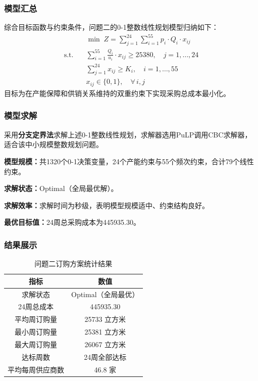 \documentclass[12pt,a4paper]{ctexart}
\theoremstyle{definition}
\theoremstyle{plain}
\theoremstyle{remark}
\begin{document}
\subsubsection{模型汇总}

综合目标函数与约束条件，问题二的0-1整数线性规划模型归纳如下：
\begin{align*}
&\min \; Z = \sum_{j=1}^{24} \sum_{i=1}^{55} p_i \cdot Q_i \cdot x_{ij} \\
\text{s.t.} \quad
&\sum_{i=1}^{55} \frac{Q_i}{u_i} \cdot x_{ij} \geq 25380, \quad j = 1, \dots, 24 \\
&\sum_{j=1}^{24} x_{ij} \geq K_i, \quad i = 1, \dots, 55 \\
&x_{ij} \in \{0, 1\}, \quad \forall\, i, j
\end{align*}
目标为在产能保障和供销关系维持的双重约束下实现采购总成本最小化。

\subsubsection{模型求解}

采用\textbf{分支定界法}求解上述0-1整数线性规划，求解器选用PuLP调用CBC求解器，适合该中小规模整数规划问题。

\textbf{模型规模：}共1320个0-1决策变量，24个产能约束与55个频次约束，合计79个线性约束。

\textbf{求解状态：}Optimal（全局最优解）。

\textbf{求解效率：}求解时间为秒级，表明模型规模适中、约束结构良好。

\textbf{最优目标值：}24周总采购成本为445935.30。

\subsubsection{结果展示}

\begin{table}[H]
\centering
\caption{问题二订购方案统计结果}
\label{tab:order}
\begin{tabular}{cc}
\toprule
指标 & 数值 \\
\midrule
求解状态 & Optimal（全局最优） \\
24周总成本 & 445935.30 \\
平均周订购量 & 25733 立方米 \\
最小周订购量 & 25381 立方米 \\
最大周订购量 & 26067 立方米 \\
达标周数 & 24周全部达标 \\
平均每周供应商数 & 46.8 家 \\
\bottomrule
\end{tabular}
\end{table}
\end{document}
